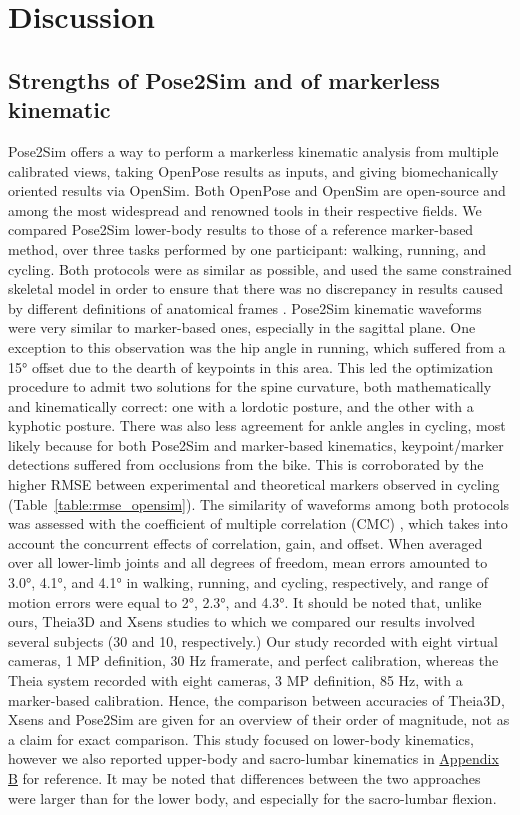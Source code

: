 \section{Discussion}

\subsection{Strengths of Pose2Sim and of markerless kinematic}

Pose2Sim offers a way to perform a markerless kinematic analysis from multiple calibrated views, taking OpenPose results as inputs, and giving biomechanically oriented results via OpenSim. Both OpenPose and OpenSim are open-source and among the most widespread and renowned tools in their respective fields. We compared Pose2Sim lower-body results to those of a reference marker-based method, over three tasks performed by one participant: walking, running, and cycling. Both protocols were as similar as possible, and used the same constrained skeletal model in order to ensure that there was no discrepancy in results caused by different definitions of anatomical frames \cite{Croce1999}. Pose2Sim kinematic waveforms were very similar to marker-based ones, especially in the sagittal plane. One exception to this observation was the hip angle in running, which suffered from a 15° offset due to the dearth of keypoints in this area. This led the optimization procedure to admit two solutions for the spine curvature, both mathematically and kinematically correct: one with a lordotic posture, and the other with a kyphotic posture. There was also less agreement for ankle angles in cycling, most likely because for both Pose2Sim and marker-based kinematics, keypoint/marker detections suffered from occlusions from the bike. This is corroborated by the higher RMSE between experimental and theoretical markers observed in cycling (Table~\ref{table:rmse_opensim}). The similarity of waveforms among both protocols was assessed with the coefficient of multiple correlation (CMC) \cite{Ferrari2010}, which takes into account the concurrent effects of correlation, gain, and offset. When averaged over all lower-limb joints and all degrees of freedom, mean errors amounted to 3.0°, 4.1°, and 4.1° in walking, running, and cycling, respectively, and range of motion errors were equal to 2°, 2.3°, and 4.3°. It should be noted that, unlike ours, Theia3D \cite{Kanko2021b} and Xsens \cite{Zhang2013} studies to which we compared our results involved several subjects (30 and 10, respectively.) Our study recorded with eight virtual cameras, 1 MP definition, 30 Hz framerate, and perfect calibration, whereas the Theia system recorded with eight cameras, 3 MP definition, 85 Hz, with a marker-based calibration. Hence, the comparison between accuracies of Theia3D, Xsens and Pose2Sim are given for an overview of their order of magnitude, not as a claim for exact comparison. This study focused on lower-body kinematics, however we also reported upper-body and sacro-lumbar kinematics in \hyperref[Ann:2]{Appendix B} for reference. It may be noted that differences between the two approaches were larger than for the lower body, and especially for the sacro-lumbar flexion.

